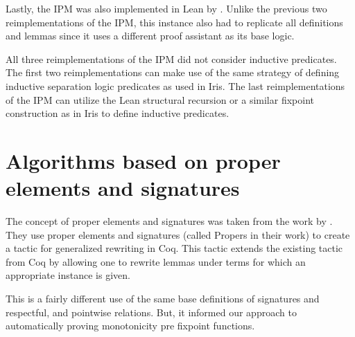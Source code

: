 \documentclass[thesis.tex]{subfiles}
\begin{document}
Lastly, the IPM was also implemented in Lean by  \cite{koenigImprovedInterfaceInteractive2022}. Unlike the previous two reimplementations of the IPM, this instance also had to replicate all definitions and lemmas since it uses a different proof assistant as its base logic.

All three reimplementations of the IPM did not consider inductive predicates. The first two reimplementations can make use of the same strategy of defining inductive separation logic predicates as used in Iris. The last reimplementations of the IPM can utilize the Lean structural recursion or a similar fixpoint construction as in Iris to define inductive predicates.

\section{Algorithms based on proper elements and signatures}
The concept of proper elements and signatures was taken from the work by  \cite{sozeauNewLookGeneralized2009}. They use proper elements and signatures (called Propers in their work) to create a tactic for generalized rewriting in Coq. This tactic extends the existing  tactic from Coq by allowing one to rewrite lemmas under terms for which an appropriate  instance is given.

This is a fairly different use of the same base definitions of signatures and respectful, and pointwise relations. But, it informed our approach to automatically proving monotonicity pre fixpoint functions.
\end{document}
